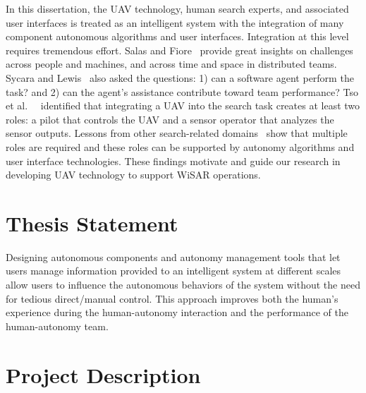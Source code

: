 In this dissertation, the UAV technology, human search experts, and associated user interfaces is treated as an intelligent system with the integration of many component autonomous algorithms and user interfaces. Integration at this level requires tremendous effort. Salas and Fiore~ provide great insights on challenges across people and machines, and across time and space in distributed teams. Sycara and Lewis~ also asked the questions: 1) can a software agent perform the task? and 2) can the agent's assistance contribute toward team performance? Tso et al.\ ~ identified that integrating a UAV into the search task creates at least two roles: a pilot that controls the UAV and a sensor operator that analyzes the sensor outputs. Lessons from other search-related domains~\cite{Drury2003Awareness} show that multiple roles are required and these roles can be supported by autonomy algorithms and user interface technologies. These findings motivate and guide our research in developing UAV technology to support WiSAR operations.

\section{Thesis Statement}
\label{thesis}

Designing autonomous components and autonomy management tools that let users manage information provided to an intelligent system at different scales allow users to influence the autonomous behaviors of the system without the need for tedious direct/manual control. This approach improves both the human's experience during the human-autonomy interaction and the performance of the human-autonomy team.

\section{Project Description}
\label{project}

